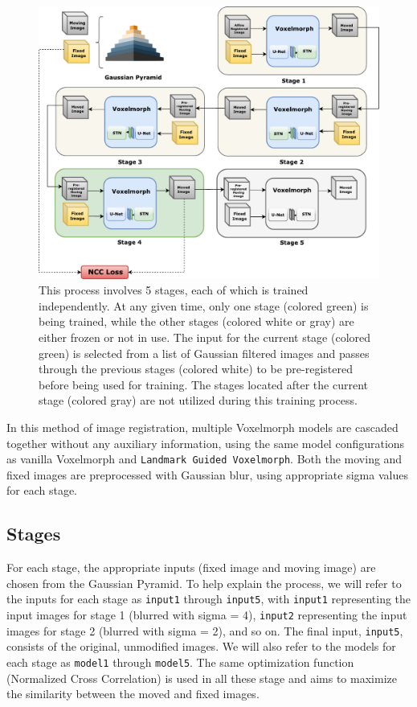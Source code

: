 \documentclass{book}
\begin{document}
    \begin{figure}[h!]
		\centering
		\includegraphics[width=\columnwidth]{resources/chapter4/methods/Method3.pdf}
		\caption{This process involves 5 stages, each of which is trained independently. At any given time, only one stage (colored green) is being trained, while the other stages (colored white or gray) are either frozen or not in use. The input for the current stage (colored green) is selected from a list of Gaussian filtered images and passes through the previous stages (colored white) to be pre-registered before being used for training. The stages located after the current stage (colored gray) are not utilized during this training process.}
		\label{fig:block_Cascaded Vanilla Voxelmorph}
	\end{figure}

	In this method of image registration, multiple Voxelmorph models are cascaded together without any auxiliary information, using the same model configurations as vanilla Voxelmorph and \texttt{Landmark Guided Voxelmorph}. Both the moving and fixed images are preprocessed with Gaussian blur, using appropriate sigma values for each stage.
	
	\subsection{Stages}
	For each stage, the appropriate inputs (fixed image and moving image) are chosen from the Gaussian Pyramid. To help explain the process, we will refer to the inputs for each stage as \texttt{input1} through \texttt{input5}, with \texttt{input1} representing the input images for stage 1 (blurred with sigma = 4), \texttt{input2} representing the input images for stage 2 (blurred with sigma = 2), and so on. The final input, \texttt{input5}, consists of the original, unmodified images. We will also refer to the models for each stage as \texttt{model1} through \texttt{model5}. The same optimization function (Normalized Cross Correlation) is used in all these stage and aims to maximize the similarity between the moved and fixed images.
	
\end{document}
